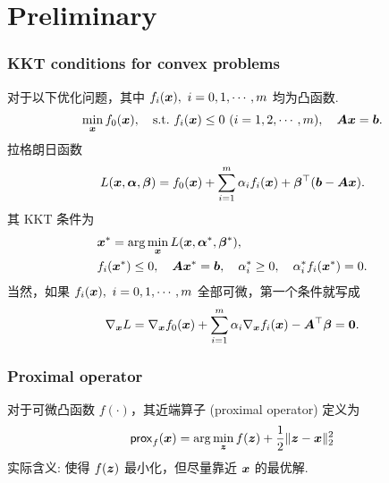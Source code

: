 \documentclass{beamer}
\begin{document}
\section{Preliminary}

\begin{frame}[fragile]
    \frametitle{KKT conditions for convex problems}
    对于以下优化问题，其中 $f_i({\bm x}),~i=0,1,\cdots,m$ 均为凸函数.
    \begin{align}
        \min_{{\bm x}}f_0({\bm x}),\quad\mathrm{s.t.}~ f_i({\bm x})\leq 0~(i=1,2,\cdots,m),\quad{\bm A}{\bm x}={\bm b}.
    \end{align}
    拉格朗日函数
    \begin{equation*}
        L({\bm x},{\bm\alpha},{\bm\beta})=f_0({\bm x})+\sum_{i=1}^m\alpha_if_i({\bm x})+{\bm\beta}^\top({\bm b}-{\bm A}{\bm x}).
    \end{equation*}
    其 KKT 条件为
    \begin{align}
        &{\bm x}^*=\arg\min_{{\bm x}}L({\bm x},{\bm\alpha}^*,{\bm\beta}^*),\\
        &f_i({\bm x}^*)\leq 0,\quad {\bm A}{\bm x}^*={\bm b},\quad\alpha_i^*\geq 0,\quad\alpha_i^*f_i({\bm x}^*)=0.
    \end{align}
    当然，如果 $f_i({\bm x}),~i=0,1,\cdots,m$ 全部可微，第一个条件就写成
    \begin{equation}
        \nabla_{{\bm x}} L=\nabla_{{\bm x}} f_0({\bm x})+\sum_{i=1}^m\alpha_i\nabla_{{\bm x}} f_i({\bm x}) -{\bm A}^\top{\bm\beta}=\bm0.
    \end{equation}
    \vspace{6pt}
\end{frame}

\begin{frame}[fragile]
    \frametitle{Proximal operator}
    对于可微凸函数 $f(\cdot)$，其近端算子 (proximal operator) 定义为
    \begin{equation*}
        \mathsf{prox}_f({\bm x})=\arg\min_{{\bm z}}f({\bm z})+\frac12\|{\bm z}-{\bm x}\|_2^2
    \end{equation*}
    实际含义: 使得 $f({\bm z})$ 最小化，但尽量靠近 ${\bm x}$ 的最优解.
\end{frame}
\end{document}
